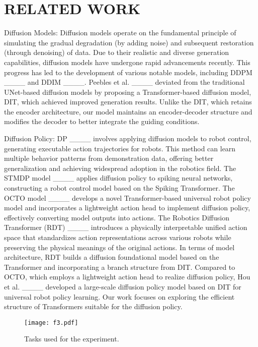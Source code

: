 \section{RELATED WORK}
Diffusion Models: Diffusion models operate on the fundamental principle of simulating the gradual degradation (by adding noise) and subsequent restoration (through denoising) of data. Due to their realistic and diverse generation capabilities, diffusion models have undergone rapid advancements recently. This progress has led to the development of various notable models, including DDPM ____ and DDIM ____. Peebles et al. ____ deviated from the traditional UNet-based diffusion models by proposing a Transformer-based diffusion model, DIT, which achieved improved generation results. Unlike the DIT, which retains the encoder architecture, our model maintains an encoder-decoder structure and modifies the decoder to better integrate the guiding conditions.

Diffusion Policy: DP ____ involves applying diffusion models to robot control, generating executable action trajectories for robots. This method can learn multiple behavior patterns from demonstration data, offering better generalization and achieving widespread adoption in the robotics field. The STMDP model ____ applies diffusion policy to spiking neural networks, constructing a robot control model based on the Spiking Transformer. The OCTO model ____ develops a novel Transformer-based universal robot policy model and incorporates a lightweight action head to implement diffusion policy, effectively converting model outputs into actions. The Robotics Diffusion Transformer (RDT) ____ introduces a physically interpretable unified action space that standardizes action representations across various robots while preserving the physical meanings of the original actions. In terms of model architecture, RDT builds a diffusion foundational model based on the Transformer and incorporating a branch structure from DIT. Compared to OCTO, which employs a lightweight action head to realize diffusion policy, Hou et al. ____ developed a large-scale diffusion policy model based on DIT for universal robot policy learning. Our work focuses on exploring the efficient structure of Transformers suitable for the diffusion policy.


\begin{figure*}[htbp]
	\centering
	\texttt{[image: f3.pdf]} %
	\caption{Tasks used for the experiment. }
	\label{fig3}
\end{figure*}
